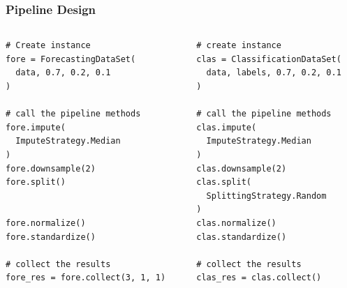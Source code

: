 \documentclass[t,english]{beamer}
\begin{document}
\begin{frame}
\begin{figure}[H]
{
    }
    \label{fig:data-flow-comparison}
  \end{figure}
\end{frame}

\begin{frame}[fragile]
  \frametitle{Pipeline Design}

  \begin{columns}
    \begin{column}{0.5\textwidth}
      \forecastingDataSet

      \begin{lstlisting}[style=python,mathescape=false,basicstyle=\ttfamily\scriptsize]
# Create instance
fore = ForecastingDataSet(
  data, 0.7, 0.2, 0.1
)

# call the pipeline methods
fore.impute(
  ImputeStrategy.Median
)
fore.downsample(2)
fore.split()


fore.normalize()
fore.standardize()

# collect the results
fore_res = fore.collect(3, 1, 1)
            \end{lstlisting}
    \end{column}

    \pause

    \begin{column}{0.5\textwidth}
      \classificationDataSet

      \begin{lstlisting}[style=python,mathescape=false,basicstyle=\ttfamily\scriptsize]
# create instance
clas = ClassificationDataSet(
  data, labels, 0.7, 0.2, 0.1
)

# call the pipeline methods
clas.impute(
  ImputeStrategy.Median
)
clas.downsample(2)
clas.split(
  SplittingStrategy.Random
)
clas.normalize()
clas.standardize()

# collect the results
clas_res = clas.collect()
            \end{lstlisting}
    \end{column}
  \end{columns}
\end{frame}
\end{document}
